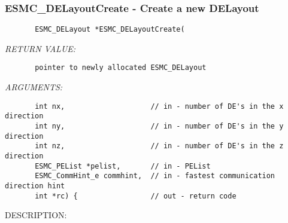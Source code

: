 
\parskip        0pt
\parindent      0pt
\baselineskip  11pt
 
\def\bv{\begin{verbatim}}
\def\ev{\end{verbatim}}
\def\be{\begin{equation}}
\def\ee{\end{equation}}
\def\bea{\begin{eqnarray}}
\def\eea{\end{eqnarray}}
\def\bi{\begin{itemize}}
\def\ei{\end{itemize}}
\def\bn{\begin{enumerate}}
\def\en{\end{enumerate}}
\def\bd{\begin{description}}
\def\ed{\end{description}}
\def\({\left (}
\def\){\right )}
\def\[{\left [}
\def\]{\right ]}
\def\<{\left  \langle}
\def\>{\right \rangle}
\def\cI{{\cal I}}
\def\diag{\mathop{\rm diag}}
\def\tr{\mathop{\rm tr}}


 
\subsubsection{ESMC\_DELayoutCreate - Create a new DELayout}


  
\begin{verbatim}       ESMC_DELayout *ESMC_DELayoutCreate(\end{verbatim}{\em RETURN VALUE:}
\begin{verbatim}       pointer to newly allocated ESMC_DELayout\end{verbatim}{\em ARGUMENTS:}
\begin{verbatim}       int nx,                    // in - number of DE's in the x direction
       int ny,                    // in - number of DE's in the y direction
       int nz,                    // in - number of DE's in the z direction
       ESMC_PEList *pelist,       // in - PEList
       ESMC_CommHint_e commhint,  // in - fastest communication direction hint
       int *rc) {                 // out - return code\end{verbatim}
{\sf DESCRIPTION:\\ }



